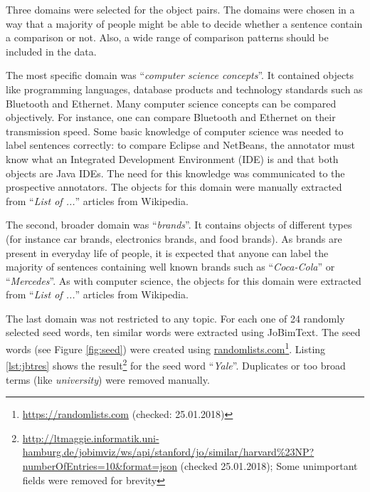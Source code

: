 Three domains were selected for the object pairs. The domains were chosen in a way that a majority of people might be able to decide whether a sentence contain a comparison or not. Also, a wide range of comparison patterns should be included in the data.

The most specific domain was \enquote{\emph{computer science concepts}}. It contained objects like programming languages, database products and technology standards such as Bluetooth and Ethernet.  Many computer science concepts can be compared objectively. For instance, one can compare Bluetooth and Ethernet on their transmission speed. Some basic knowledge of computer science was needed to label sentences correctly: to compare Eclipse and NetBeans, the annotator must know what an Integrated Development Environment (IDE) is and that both objects are Java IDEs.  The need for this knowledge was communicated to the prospective annotators. The objects for this domain were manually extracted from \enquote{\emph{List of ...}} articles from Wikipedia.

The second, broader domain was \enquote{\emph{brands}}. It contains objects of different types (for instance car brands, electronics brands, and food brands). As brands are present in everyday life of people, it is expected that anyone can label the majority of sentences containing well known brands such as \enquote{\emph{Coca-Cola}} or \enquote{\emph{Mercedes}}. As with computer science, the objects for this domain were extracted from \enquote{\emph{List of ...}} articles from Wikipedia.

The last domain was not restricted to any topic. For each one of 24 randomly selected seed words, ten similar words were extracted using JoBimText. The seed words (see Figure \ref{fig:seed}) were created using \url{randomlists.com}\footnote{\url{https://randomlists.com}  (checked: 25.01.2018)}. Listing \ref{lst:jbtres} shows the result\footnote{\url{http://ltmaggie.informatik.uni-hamburg.de/jobimviz/ws/api/stanford/jo/similar/harvard\%23NP?numberOfEntries=10&format=json} (checked 25.01.2018); Some unimportant fields were removed for brevity} for the seed word \enquote{\emph{Yale}}. Duplicates or too broad terms (like \emph{university}) were removed manually.

